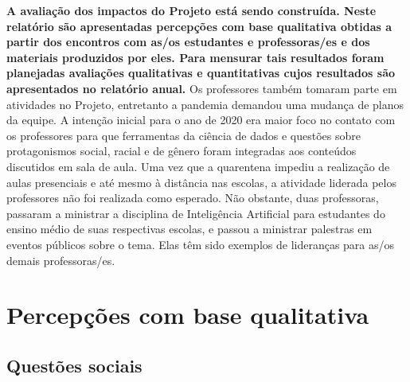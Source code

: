 \documentclass[
]{book}
\begin{document}
\textbf{A avaliação dos impactos do Projeto está sendo construída. Neste relatório são apresentadas percepções com base qualitativa obtidas a partir dos encontros com as/os estudantes e professoras/es e dos materiais produzidos por eles. Para mensurar tais resultados foram planejadas avaliações qualitativas e quantitativas cujos resultados são apresentados no relatório anual.}
Os professores também tomaram parte em atividades no Projeto, entretanto a pandemia demandou uma mudança de planos da equipe. A intenção inicial para o ano de 2020 era maior foco no contato com os professores para que ferramentas da ciência de dados e questões sobre protagonismos social, racial e de gênero foram integradas aos conteúdos discutidos em sala de aula. Uma vez que a quarentena impediu a realização de aulas presenciais e até mesmo à distância nas escolas, a atividade liderada pelos professores não foi realizada como esperado. Não obstante, duas professoras, passaram a ministrar a disciplina de Inteligência Artificial para estudantes do ensino médio de suas respectivas escolas, e passou a ministrar palestras em eventos públicos sobre o tema. Elas têm sido exemplos de lideranças para as/os demais professoras/es.

\hypertarget{percepuxe7uxf5es-com-base-qualitativa}{%
\section{Percepções com base qualitativa}\label{percepuxe7uxf5es-com-base-qualitativa}}

\hypertarget{questuxf5es-sociais}{%
\subsection{Questões sociais}\label{questuxf5es-sociais}}
\end{document}
